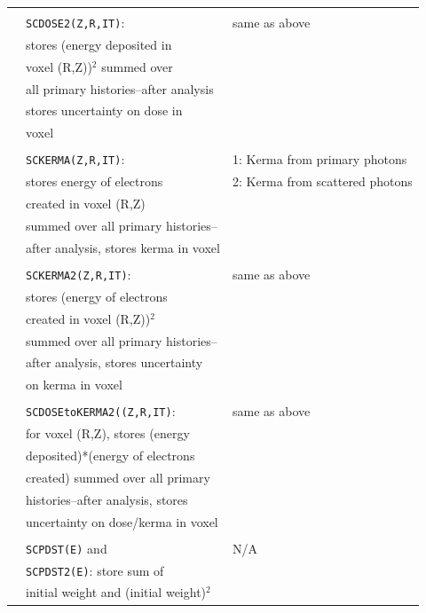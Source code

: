 \documentclass[12pt,twoside]{article}  %
\begin{document}
\begin{longtable}{lll}
          &                       & \\
          & {\tt SCDOSE2(Z,R,IT)}:  & same as above\\
          & stores (energy deposited in &\\
          & voxel (R,Z))$^2$ summed over &\\
          & all primary histories--after analysis &\\
          & stores uncertainty on dose in&\\
          & voxel &\\
          &                       & \\
          & {\tt SCKERMA(Z,R,IT)}: & 1: Kerma from primary photons\\
          & stores energy of electrons & 2: Kerma from scattered photons\\
          & created in voxel (R,Z) &\\
          & summed over all primary histories--&\\
          & after analysis, stores kerma in voxel&\\
          &                        &\\
          & {\tt SCKERMA2(Z,R,IT)}: & same as above\\
          & stores (energy of electrons &\\
          & created in voxel (R,Z))$^2$ &\\
          & summed over all primary histories--&\\ 
          & after analysis, stores uncertainty&\\
          & on kerma in voxel &\\
          &                   &\\
          & {\tt SCDOSEtoKERMA2((Z,R,IT)}: & same as above\\
          & for voxel (R,Z), stores (energy&\\
          & deposited)*(energy of electrons&\\
          & created) summed over all primary&\\
          & histories--after analysis, stores&\\
          & uncertainty on dose/kerma in voxel&\\
          &&\\
          & {\tt SCPDST(E)} and & N/A\\
          & {\tt SCPDST2(E)}: store sum of&\\
          & initial weight and (initial weight)$^2$&\\

\end{longtable}
\end{document}
